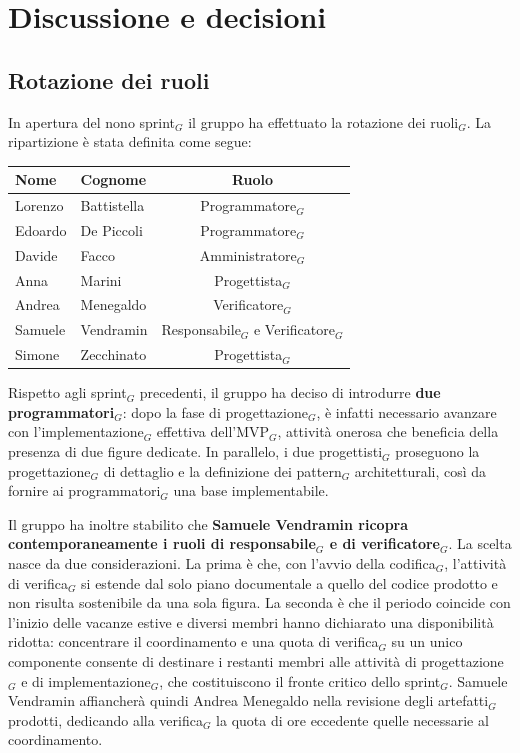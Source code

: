\documentclass[a4paper, 10pt, colorlinks=true, linkcolor=black, urlcolor=blue, citecolor=blue, hidelinks]{article}
\begin{document}
\section{Discussione e decisioni}

\subsection{Rotazione dei ruoli}
In apertura del nono sprint$_G$ il gruppo ha effettuato la rotazione dei ruoli$_G$. La ripartizione è stata definita come segue:
\begin{center}
    \begin{tabular}{|l|l|c|}
        \hline
        \textbf{Nome} & \textbf{Cognome} & \textbf{Ruolo} \\
        \hline
        Lorenzo & Battistella & Programmatore$_G$ \\
        \hline
        Edoardo & De Piccoli & Programmatore$_G$ \\
        \hline
        Davide & Facco & Amministratore$_G$ \\
        \hline
        Anna & Marini & Progettista$_G$ \\
        \hline
        Andrea & Menegaldo & Verificatore$_G$ \\
        \hline
        Samuele & Vendramin & Responsabile$_G$ e Verificatore$_G$ \\
        \hline
        Simone & Zecchinato & Progettista$_G$ \\
        \hline
    \end{tabular}
\end{center}

Rispetto agli sprint$_G$ precedenti, il gruppo ha deciso di introdurre \textbf{due programmatori$_G$}: dopo la fase di progettazione$_G$, è infatti necessario avanzare con l'implementazione$_G$ effettiva dell'MVP$_G$, attività onerosa che beneficia della presenza di due figure dedicate. In parallelo, i due progettisti$_G$ proseguono la progettazione$_G$ di dettaglio e la definizione dei pattern$_G$ architetturali, così da fornire ai programmatori$_G$ una base implementabile.

Il gruppo ha inoltre stabilito che \textbf{Samuele Vendramin ricopra contemporaneamente i ruoli di responsabile$_G$ e di verificatore$_G$}. La scelta nasce da due considerazioni. La prima è che, con l'avvio della codifica$_G$, l'attività di verifica$_G$ si estende dal solo piano documentale a quello del codice prodotto e non risulta sostenibile da una sola figura. La seconda è che il periodo coincide con l'inizio delle vacanze estive e diversi membri hanno dichiarato una disponibilità ridotta: concentrare il coordinamento e una quota di verifica$_G$ su un unico componente consente di destinare i restanti membri alle attività di progettazione$_G$ e di implementazione$_G$, che costituiscono il fronte critico dello sprint$_G$. Samuele Vendramin affiancherà quindi Andrea Menegaldo nella revisione degli artefatti$_G$ prodotti, dedicando alla verifica$_G$ la quota di ore eccedente quelle necessarie al coordinamento.
\end{document}
